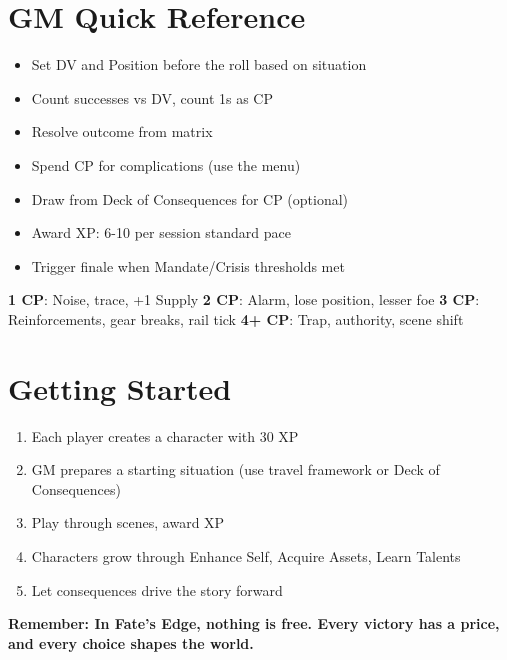 \documentclass[11pt]{article}
\begin{document}
\section{GM Quick Reference}

\begin{itemize}
    \item Set DV and Position before the roll based on situation
    \item Count successes vs DV, count 1s as CP
    \item Resolve outcome from matrix
    \item Spend CP for complications (use the menu)
    \item Draw from Deck of Consequences for CP (optional)
    \item Award XP: 6-10 per session standard pace
    \item Trigger finale when Mandate/Crisis thresholds met
\end{itemize}

\begin{fatebox}
\textbf{1 CP}: Noise, trace, +1 Supply
\textbf{2 CP}: Alarm, lose position, lesser foe
\textbf{3 CP}: Reinforcements, gear breaks, rail tick  
\textbf{4+ CP}: Trap, authority, scene shift
\end{fatebox}

\section{Getting Started}

\begin{enumerate}
    \item Each player creates a character with 30 XP
    \item GM prepares a starting situation (use travel framework or Deck of Consequences)
    \item Play through scenes, award XP
    \item Characters grow through Enhance Self, Acquire Assets, Learn Talents
    \item Let consequences drive the story forward
\end{enumerate}

\begin{center}
\textbf{Remember: In Fate's Edge, nothing is free. Every victory has a price, and every choice shapes the world.}
\end{center}
\end{document}

